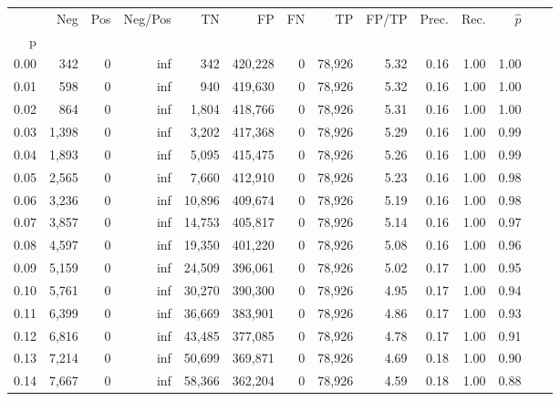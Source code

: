 \begin{tabular}{rrrrrrrrrrrrrr}
\toprule
{} &    Neg &    Pos &  Neg/Pos &       TN &       FP &      FN &      TP & FP/TP & Prec. &  Rec. & $\hat{p}$ \\
p    &        &        &          &          &          &         &         &       &       &       &           \\
\midrule
0.00 &    342 &      0 &      inf &      342 &  420,228 &       0 &  78,926 &  5.32 &  0.16 &  1.00 &      1.00 \\
0.01 &    598 &      0 &      inf &      940 &  419,630 &       0 &  78,926 &  5.32 &  0.16 &  1.00 &      1.00 \\
0.02 &    864 &      0 &      inf &    1,804 &  418,766 &       0 &  78,926 &  5.31 &  0.16 &  1.00 &      1.00 \\
0.03 &  1,398 &      0 &      inf &    3,202 &  417,368 &       0 &  78,926 &  5.29 &  0.16 &  1.00 &      0.99 \\
0.04 &  1,893 &      0 &      inf &    5,095 &  415,475 &       0 &  78,926 &  5.26 &  0.16 &  1.00 &      0.99 \\
0.05 &  2,565 &      0 &      inf &    7,660 &  412,910 &       0 &  78,926 &  5.23 &  0.16 &  1.00 &      0.98 \\
0.06 &  3,236 &      0 &      inf &   10,896 &  409,674 &       0 &  78,926 &  5.19 &  0.16 &  1.00 &      0.98 \\
0.07 &  3,857 &      0 &      inf &   14,753 &  405,817 &       0 &  78,926 &  5.14 &  0.16 &  1.00 &      0.97 \\
0.08 &  4,597 &      0 &      inf &   19,350 &  401,220 &       0 &  78,926 &  5.08 &  0.16 &  1.00 &      0.96 \\
0.09 &  5,159 &      0 &      inf &   24,509 &  396,061 &       0 &  78,926 &  5.02 &  0.17 &  1.00 &      0.95 \\
0.10 &  5,761 &      0 &      inf &   30,270 &  390,300 &       0 &  78,926 &  4.95 &  0.17 &  1.00 &      0.94 \\
0.11 &  6,399 &      0 &      inf &   36,669 &  383,901 &       0 &  78,926 &  4.86 &  0.17 &  1.00 &      0.93 \\
0.12 &  6,816 &      0 &      inf &   43,485 &  377,085 &       0 &  78,926 &  4.78 &  0.17 &  1.00 &      0.91 \\
0.13 &  7,214 &      0 &      inf &   50,699 &  369,871 &       0 &  78,926 &  4.69 &  0.18 &  1.00 &      0.90 \\
0.14 &  7,667 &      0 &      inf &   58,366 &  362,204 &       0 &  78,926 &  4.59 &  0.18 &  1.00 &      0.88 \\

\end{tabular}

